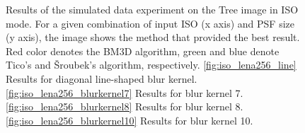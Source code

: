 \documentclass[12pt,notitlepage]{report}
\begin{document}
\begin{figure}[htb]
  \caption[Results for the tree image in ISO mode]{Results of the simulated data experiment on the Tree image in ISO mode. For a given combination of input ISO (x axis) and PSF size (y axis), the image shows the method that provided the best result. Red color denotes the BM3D algorithm, green and blue denote Tico's and Šroubek's algorithm, respectively. \ref{fig:iso_lena256_line} Results for diagonal line-shaped blur kernel. \ref{fig:iso_lena256_blurkernel7} Results for blur kernel 7. \ref{fig:iso_lena256_blurkernel8} Results for blur kernel 8. \ref{fig:iso_lena256_blurkernel10} Results for blur kernel 10.}
  \label{fig:iso_tree256}
\end{figure}

\clearpage
\end{document}
